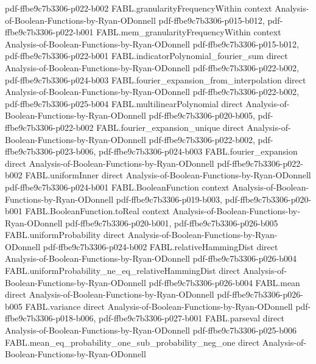 \begin{theorem}
  {pdf-ffbe9c7b3306-p022-b002}
\proofstep
  {FABL.granularityFrequencyWithin}
  {context}
  {Analysis-of-Boolean-Functions-by-Ryan-ODonnell}
  {pdf-ffbe9c7b3306-p015-b012,
    pdf-ffbe9c7b3306-p022-b001}
\proofstep
  {FABL.mem_granularityFrequencyWithin}
  {context}
  {Analysis-of-Boolean-Functions-by-Ryan-ODonnell}
  {pdf-ffbe9c7b3306-p015-b012,
    pdf-ffbe9c7b3306-p022-b001}
\proofstep
  {FABL.indicatorPolynomial_fourier_sum}
  {direct}
  {Analysis-of-Boolean-Functions-by-Ryan-ODonnell}
  {pdf-ffbe9c7b3306-p022-b002,
    pdf-ffbe9c7b3306-p024-b003}
\proofstep
  {FABL.fourier_expansion_from_interpolation}
  {direct}
  {Analysis-of-Boolean-Functions-by-Ryan-ODonnell}
  {pdf-ffbe9c7b3306-p022-b002,
    pdf-ffbe9c7b3306-p025-b004}
\proofstep
  {FABL.multilinearPolynomial}
  {direct}
  {Analysis-of-Boolean-Functions-by-Ryan-ODonnell}
  {pdf-ffbe9c7b3306-p020-b005,
    pdf-ffbe9c7b3306-p022-b002}
\proofstep
  {FABL.fourier_expansion_unique}
  {direct}
  {Analysis-of-Boolean-Functions-by-Ryan-ODonnell}
  {pdf-ffbe9c7b3306-p022-b002,
    pdf-ffbe9c7b3306-p023-b006,
    pdf-ffbe9c7b3306-p024-b003}
\proofstep
  {FABL.fourier_expansion}
  {direct}
  {Analysis-of-Boolean-Functions-by-Ryan-ODonnell}
  {pdf-ffbe9c7b3306-p022-b002}
\proofstep
  {FABL.uniformInner}
  {direct}
  {Analysis-of-Boolean-Functions-by-Ryan-ODonnell}
  {pdf-ffbe9c7b3306-p024-b001}
\proofstep
  {FABL.BooleanFunction}
  {context}
  {Analysis-of-Boolean-Functions-by-Ryan-ODonnell}
  {pdf-ffbe9c7b3306-p019-b003,
    pdf-ffbe9c7b3306-p020-b001}
\proofstep
  {FABL.BooleanFunction.toReal}
  {context}
  {Analysis-of-Boolean-Functions-by-Ryan-ODonnell}
  {pdf-ffbe9c7b3306-p020-b001,
    pdf-ffbe9c7b3306-p026-b005}
\proofstep
  {FABL.uniformProbability}
  {direct}
  {Analysis-of-Boolean-Functions-by-Ryan-ODonnell}
  {pdf-ffbe9c7b3306-p024-b002}
\proofstep
  {FABL.relativeHammingDist}
  {direct}
  {Analysis-of-Boolean-Functions-by-Ryan-ODonnell}
  {pdf-ffbe9c7b3306-p026-b004}
\proofstep
  {FABL.uniformProbability_ne_eq_relativeHammingDist}
  {direct}
  {Analysis-of-Boolean-Functions-by-Ryan-ODonnell}
  {pdf-ffbe9c7b3306-p026-b004}
\proofstep
  {FABL.mean}
  {direct}
  {Analysis-of-Boolean-Functions-by-Ryan-ODonnell}
  {pdf-ffbe9c7b3306-p026-b005}
\proofstep
  {FABL.variance}
  {direct}
  {Analysis-of-Boolean-Functions-by-Ryan-ODonnell}
  {pdf-ffbe9c7b3306-p018-b006,
    pdf-ffbe9c7b3306-p027-b001}
\proofstep
  {FABL.parseval}
  {direct}
  {Analysis-of-Boolean-Functions-by-Ryan-ODonnell}
  {pdf-ffbe9c7b3306-p025-b006}
\proofstep
  {FABL.mean_eq_probability_one_sub_probability_neg_one}
  {direct}
  {Analysis-of-Boolean-Functions-by-Ryan-ODonnell}

\end{theorem}
